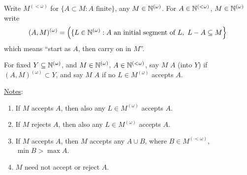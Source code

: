 \documentclass[10pt]{article}
\newcommand{\bom}{{(\omega)}}
\newcommand{\blom}{{(<\omega)}}
\begin{document}
\begin{remark*}[Sociology]
    Write $M^{\blom}$ for $\{A \subset M : A\textrm{ finite}\}$, any $M \in \N^\bom$. For $A \in \N^\blom$, $M \in \N^\bom$ write $$(A,M)^\bom = \lef\lbrace L \in \N^\bom : A\textrm{ an initial segment of }L,\ L - A \subset M\right\rbrace$$
    which means ``start as $A$, then carry on in $M$''.

    For fixed $Y \subset \N^\bom$, and $M \in \N^\bom$, $A \in \N^\blom$, say $M$  $A$ (into $Y$) if $(A,M)^\bom \subset Y$, and say $M$  $A$ if no $L \in M^\bom$ accepts $A$.

    \underline{Notes}:\ 
    \begin{enumerate}
        \item If $M$ accepts $A$, then also any $L \in M^\bom$ accepts $A$.
        \item If $M$ rejects $A$, then also any $L \in M^\bom$ accepts $A$.
        \item If $M$ accepts $A$, then $M$ accepts any $A\cup B$, where $B \in M^\blom$, $\min B > \max A$.
        \item $M$ need not accept or reject $A$.
    \end{enumerate}
\end{remark*}
\end{document}
